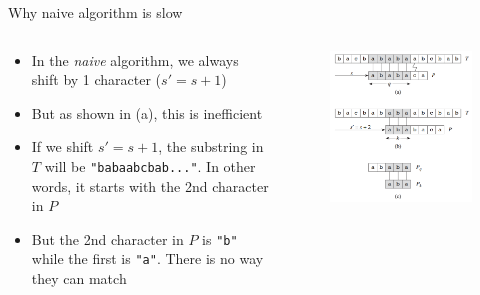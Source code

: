 \documentclass[10pt,xcolor={table,dvipsnames},t]{beamer}
\begin{document}
\begin{frame}{Why naive algorithm is slow}
  \begin{columns}
    \begin{column}{0.55\textwidth}
      \begin{itemize}
        \item In the \textit{naive} algorithm, we always shift by 1 character ($s' = s+1$)
        \item But as shown in (a), this is inefficient
        \item If we shift $s'=s+1$, the substring in $T$ will be \texttt{"babaabcbab..."}. In other words, it starts with the 2nd character in $P$
        \item But the 2nd character in $P$ is \texttt{"b"} while the first is \texttt{"a"}. There is no way they can match
      \end{itemize}
    \end{column}
    \begin{column}{0.45\textwidth}
      \begin{figure}
        \includegraphics[width=\textwidth]{img/kmp-why-naive-slow.PNG}
      \end{figure}
    \end{column}
  \end{columns}
\end{frame}
\end{document}
